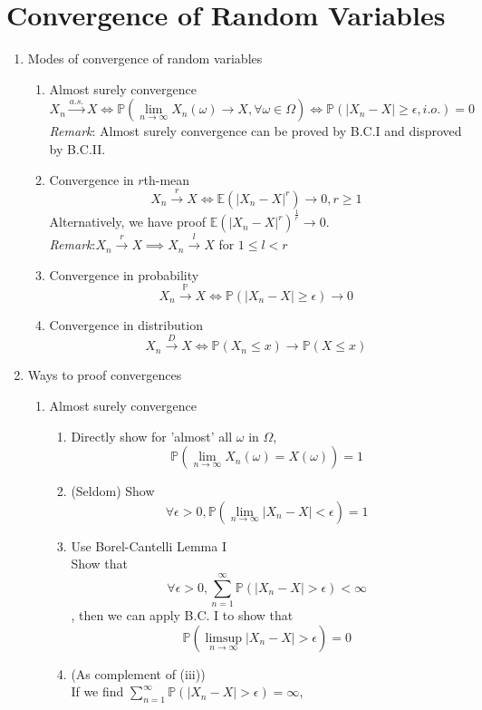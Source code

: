 \documentclass[11pt]{article}
\begin{document}
\section{Convergence of Random Variables}
\begin{enumerate}
\item{Modes of convergence of random variables}
\begin{enumerate}
\item{Almost surely convergence}
$$X_{n} \xrightarrow{a.s.} X \iff \mathbb{P}(\lim_{n \to \infty}X_{n} (\omega) \to X, \forall \omega \in \Omega) \iff \mathbb{P}(|X_{n} - X| \geq \epsilon, i.o.) = 0$$
\textit{Remark}: Almost surely convergence can be proved by B.C.I and disproved by B.C.II.
\item{Convergence in $r$th-mean}
$$X_{n} \xrightarrow{r} X \iff \mathbb{E}(|X_{n} - X|^{r}) \to 0, r \geq 1$$
Alternatively, we have proof $\mathbb{E}(|X_{n} - X|^{r})^{\frac{1}{r}} \to 0$.\\
\textit{Remark}:$X_{n} \xrightarrow{r} X \implies X_{n} \xrightarrow{l} X$ for $1\leq l < r$
\item{Convergence in probability}
$$X_{n} \xrightarrow{\mathbb{P}} X \iff \mathbb{P}(|X_{n} - X| \geq \epsilon) \to 0 $$
\item{Convergence in distribution}
$$X_{n} \xrightarrow{D} X \iff \mathbb{P}(X_{n} \leq x) \to \mathbb{P}(X \leq x)$$
\end{enumerate}
\item{Ways to proof convergences}
\begin{enumerate}
\item{Almost surely convergence}
\begin{enumerate}
\item{Directly show for 'almost' all $\omega$ in $\Omega$, $$\mathbb{P}(\lim_{n \to \infty} X_{n}(\omega) = X(\omega)) = 1$$}
\item{(Seldom) Show $$\forall \epsilon > 0, \mathbb{P}(\lim_{n \to \infty}|X_{n} - X| < \epsilon) = 1$$} 
\item{Use Borel-Cantelli Lemma I}\\
Show that $$\forall \epsilon > 0, \sum_{n=1}^{\infty}\mathbb{P}(|X_{n} - X|> \epsilon)< \infty$$, then we can apply B.C. I to show that 
$$\mathbb{P}(\limsup_{n \to \infty} |X_{n} - X|> \epsilon) = 0$$
\item{(As complement of (iii))}\\
If we find  $\sum_{n=1}^{\infty}\mathbb{P}(|X_{n} - X|> \epsilon)= \infty$,\\

\end{enumerate}
\end{enumerate}
\end{enumerate}
\end{document}
